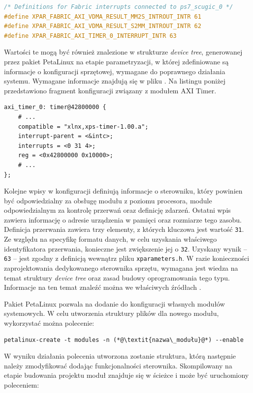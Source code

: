 \begin{lstlisting}[language=C]
/* Definitions for Fabric interrupts connected to ps7_scugic_0 */
#define XPAR_FABRIC_AXI_VDMA_RESULT_MM2S_INTROUT_INTR 61
#define XPAR_FABRIC_AXI_VDMA_RESULT_S2MM_INTROUT_INTR 62
#define XPAR_FABRIC_AXI_TIMER_0_INTERRUPT_INTR 63
\end{lstlisting}

Wartości te mogą być również znalezione w strukturze \textit{device tree}, generowanej przez pakiet PetaLinux na etapie parametryzacji, w której zdefiniowane są informacje o konfiguracji sprzętowej, wymagane do poprawnego działania systemu.
Wymagane informacje znajdują się w pliku . 
Na listingu poniżej przedstawiono fragment konfiguracji związany z modułem AXI Timer.

\begin{lstlisting}
axi_timer_0: timer@42800000 {
	# ...
	compatible = "xlnx,xps-timer-1.00.a";
	interrupt-parent = <&intc>;
	interrupts = <0 31 4>;
	reg = <0x42800000 0x10000>;
	# ...
};
\end{lstlisting}
Kolejne wpisy w konfiguracji definiują informacje o sterowniku, który powinien być odpowiedzialny za obsługę modułu z poziomu procesora, module odpowiedzialnym za kontrolę przerwań oraz definicję zdarzeń. 
Ostatni wpis zawiera informację o adresie urządzenia w pamięci oraz rozmiarze tego zasobu.
Definicja przerwania zawiera trzy elementy, z których kluczowa jest wartość \texttt{31}. 
Ze względu na specyfikę formatu danych, w celu uzyskania właściwego identyfikatora przerwania, konieczne jest zwiększenie jej o \texttt{32}. Uzyskany wynik -- \texttt{63} -- jest zgodny z definicją wewnątrz pliku \texttt{xparameters.h}.
W razie konieczności zaprojektowania dedykowanego sterownika sprzętu, wymagana jest wiedza na temat struktury \textit{device tree} oraz zasad budowy oprogramowania tego typu. 
Informacje na ten temat znaleźć można we właściwych źródłach \cite{Corbet2005,device-tree-tutorial}.

Pakiet PetaLinux pozwala na dodanie do konfiguracji własnych modułów systemowych. 
W celu utworzenia struktury plików dla nowego modułu, wykorzystać można polecenie:

\begin{lstlisting}[breaklines=true]
petalinux-create -t modules -n (*@\textit{nazwa\_modułu}@*) --enable
\end{lstlisting}

W wyniku działania polecenia utworzona zostanie struktura, którą następnie należy zmodyfikować dodając funkcjonalności sterownika.
Skompilowany na etapie budowania projektu moduł znajduje się w ścieżce  i może być uruchomiony poleceniem:

